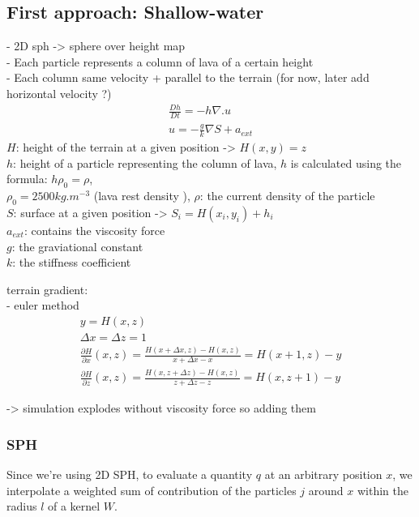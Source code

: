 \documentclass{article}
\begin{document}
\subsection*{First approach: Shallow-water}

- 2D sph -> sphere over height map\\
- Each particle represents a column of lava of a certain height\\
- Each column same velocity + parallel to the terrain (for now, later add horizontal velocity ?)\\

\begin{align}
    \frac{Dh}{Dt} = -h\nabla.u\\
    u = -\frac{g}{k}\nabla{S} + a_{ext}
\end{align}
$H$: height of the terrain at a given position -> $H(x,y) = z$\\
$h$: height of a particle representing the column of lava, $h$ is calculated using the formula: 
$h \rho_0 = \rho$,\\ 
$\rho_0 = 2500 kg.m^{-3}$ (lava rest density \cite{Griffiths}), $\rho$: the current density of the particle\\
$S$: surface at a given position -> $S_i = H(x_i,y_i) + h_i$\\
$a_{ext}$: contains the viscosity force\\
$g$: the graviational constant\\
$k$: the stiffness coefficient


terrain gradient:\\
- euler method 
\begin{gather*}
    y = H(x,z)\\
    \Delta{x} = \Delta{z} = 1\\
   \frac{\partial H}{\partial x} (x,z) = \frac{H(x+\Delta{x}, z) - H(x,z)}{x+\Delta{x}-x} = H(x+1, z) - y\\
   \frac{\partial H}{\partial z} (x,z) = \frac{H(x, z+\Delta{z}) - H(x,z)}{z+\Delta{z}-z} = H(x, z+1) - y
\end{gather*}

-> simulation explodes without viscosity force so adding them 

\subsubsection*{SPH}

Since we're using 2D SPH, to evaluate a quantity $q$ at an arbitrary position $x$, we interpolate a weighted sum of contribution of the particles $j$ around $x$ within the radius $l$ of a kernel $W$.
\end{document}
